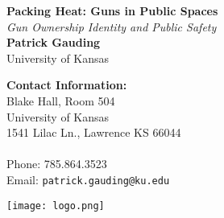 \documentclass[a0,landscape]{a0poster}
\begin{document}


\begin{minipage}[b]{0.55\linewidth}
\veryHuge \color{NavyBlue} \textbf{Packing Heat: Guns in Public Spaces} \color{Black}\\ %
\Huge\textit{Gun Ownership Identity and Public Safety}\\[1cm] %
\huge \textbf{Patrick Gauding}\\ %
\huge University of Kansas\\ %
\end{minipage}
%
\begin{minipage}[b]{0.25\linewidth}
\color{DarkSlateGray}\Large \textbf{Contact Information:}\\
Blake Hall, Room 504\\ %
University of Kansas\\
1541 Lilac Ln., Lawrence KS 66044\\\\
Phone: 785.864.3523 \\ %
Email: \texttt{patrick.gauding@ku.edu}\\ %
\end{minipage}
%
\begin{minipage}[b]{0.19\linewidth}
\texttt{[image: logo.png]} %
\end{minipage}

\vspace{1cm} %

\end{document}
